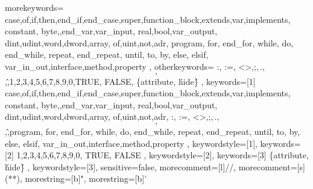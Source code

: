 \edef\CurrentFileDir{\currfiledir} 
\graphicspath{{\CurrentFileDir figures/}}

\newcommand{\UPSTIsource}{Certaines images proviennent du site freepics.com}
\newcommand{\UPSTItitreEnTete}{POO}


{
	morekeywords={
	case,of,if,then,end_if,end_case,super,function_block,extends,var,implements,
	constant, byte,,end_var,var_input, real,bool,var_output,
	dint,udint,word,dword,array, of,uint,not,adr, program, for, end_for, while, do, end_while, repeat, end_repeat, until, to, by, else, elsif, var_in_out,interface,method,property
	},
	otherkeywords={
		:, :=, <>,;,\,.,\[,\],\^,1,2,3,4,5,6,7,8,9,0,TRUE, FALSE, \{attribute,  \'hide\'\}
	},
	keywords=[1]{
		case,of,if,then,end_if,end_case,super,function_block,extends,var,implements,
		constant, byte,,end_var,var_input, real,bool,var_output,
		dint,udint,word,dword,array, of,uint,not,adr, :, :=, <>,;,\,.,\[,\],\^,program, for, end_for, while, do, end_while, repeat, end_repeat, until, to, by, else, elsif, var_in_out,interface,method,property
	},
	keywordstyle=[1]\color{blue},
	keywords=[2]{
		1,2,3,4,5,6,7,8,9,0, TRUE, FALSE
	},
	keywordstyle=[2]\color{codepurple},
	keywords=[3]{
		\{attribute,  \'hide\'\}
	},
	keywordstyle=[3]\color{codegray},
	sensitive=false,
	morecomment=[l]{//}, 
	morecomment=[s]{(*}{*)},
	morestring=[b]{"},
	morestring=[b]{'}
}

